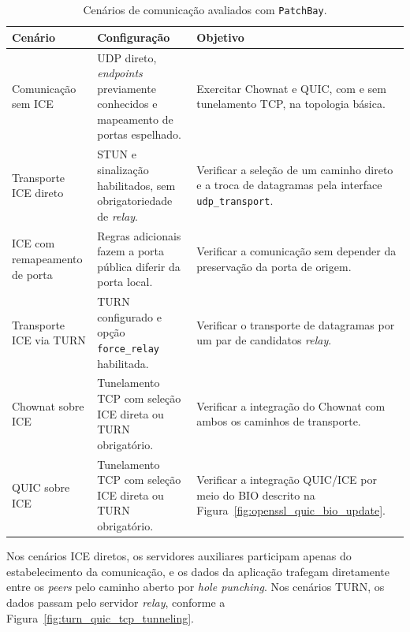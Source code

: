 \begin{table}[htbp]
    \centering
    \caption{Cenários de comunicação avaliados com \texttt{PatchBay}.}
    \label{tab:experimental_scenarios}
    \small
    \begin{tabular}{@{}p{}p{}p{}@{}}
        \toprule
        \textbf{Cenário} &
        \textbf{Configuração} &
        \textbf{Objetivo} \\
        \midrule
        Comunicação sem ICE &
        UDP direto, \textit{endpoints} previamente conhecidos
        e mapeamento de portas espelhado. &
        Exercitar Chownat e QUIC, com e sem tunelamento
        TCP, na topologia básica. \\
        Transporte ICE direto &
        STUN e sinalização habilitados, sem
        obrigatoriedade de \textit{relay}. &
        Verificar a seleção de um caminho direto
        e a troca de datagramas pela interface
        \texttt{udp\_transport}. \\
        ICE com remapeamento de porta &
        Regras adicionais fazem a porta pública
        diferir da porta local. &
        Verificar a comunicação sem depender
        da preservação da porta de origem. \\
        Transporte ICE via TURN &
        TURN configurado e opção
        \texttt{force\_relay} habilitada. &
        Verificar o transporte de datagramas por
        um par de candidatos \textit{relay}. \\
        Chownat sobre ICE &
        Tunelamento TCP com seleção ICE direta
        ou TURN obrigatório. &
        Verificar a integração do Chownat com
        ambos os caminhos de transporte. \\
        QUIC sobre ICE &
        Tunelamento TCP com seleção ICE direta
        ou TURN obrigatório. &
        Verificar a integração QUIC/ICE por meio
        do BIO descrito na
        Figura~\ref{fig:openssl_quic_bio_update}. \\
        \bottomrule
    \end{tabular}
\end{table}

Nos cenários ICE diretos, os servidores auxiliares participam apenas do estabelecimento da comunicação, e os dados da aplicação trafegam diretamente entre os \textit{peers} pelo caminho aberto por \textit{hole punching}. Nos cenários TURN, os dados passam pelo servidor \textit{relay}, conforme a Figura~\ref{fig:turn_quic_tcp_tunneling}.

